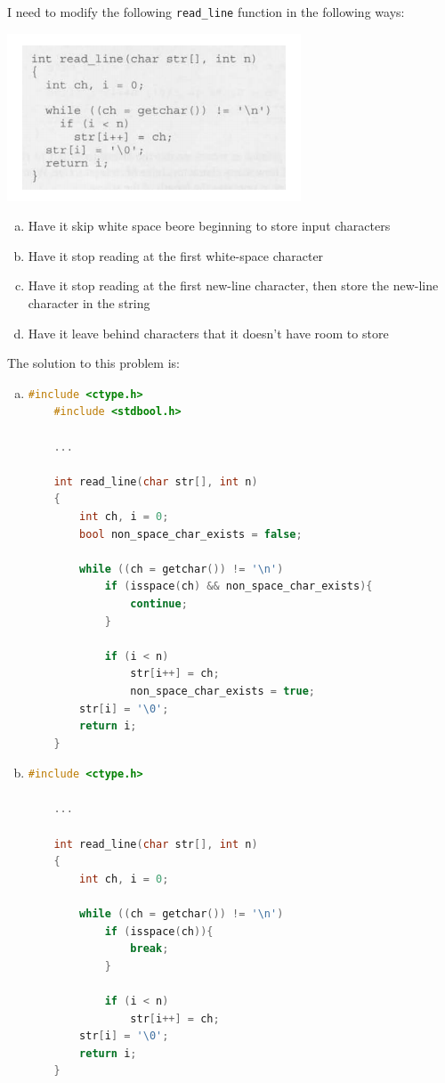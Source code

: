\documentclass[12pt]{article}
\begin{document}
\begin{enumerate}[1.]
    I need to modify the following \texttt{read\_line} function in the following ways:

    \begin{center}
    \includegraphics[width=0.5\linewidth]{images/review_6_solution_1.png}
    \end{center}

    \begin{enumerate}[a)]
        \item Have it skip white space beore beginning to store input characters
        \item Have it stop reading at the first white-space character
        \item Have it stop reading at the first new-line character, then store the new-line character in the string
        \item Have it leave behind characters that it doesn't have room to store
    \end{enumerate}

    \bigskip

    The solution to this problem is:

    \begin{enumerate}[a)]
        \item

\begin{lstlisting}[language=c]
    #include <ctype.h>
    #include <stdbool.h>

    ...

    int read_line(char str[], int n)
    {
        int ch, i = 0;
        bool non_space_char_exists = false;

        while ((ch = getchar()) != '\n')
            if (isspace(ch) && non_space_char_exists){
                continue;
            }

            if (i < n)
                str[i++] = ch;
                non_space_char_exists = true;
        str[i] = '\0';
        return i;
    }
\end{lstlisting}

        \item

\begin{lstlisting}[language=c]
    #include <ctype.h>

    ...

    int read_line(char str[], int n)
    {
        int ch, i = 0;

        while ((ch = getchar()) != '\n')
            if (isspace(ch)){
                break;
            }

            if (i < n)
                str[i++] = ch;
        str[i] = '\0';
        return i;
    }
\end{lstlisting}
    \end{enumerate}

\end{enumerate}
\end{document}
